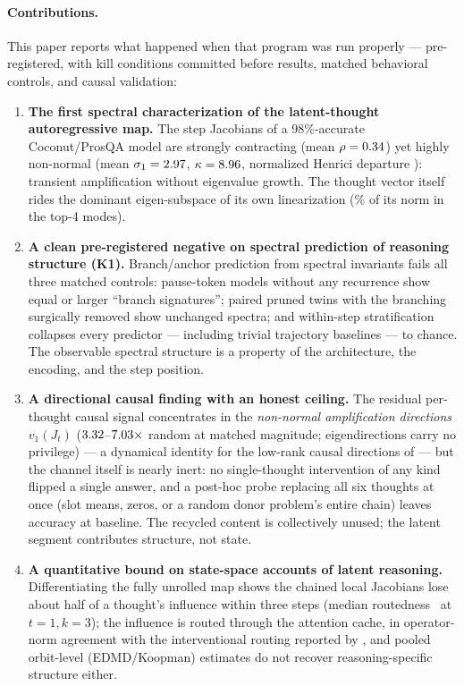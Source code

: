 \documentclass[11pt]{article}
\newcommand{\Jt}{J_t}
\newcommand{\sigmaone}{\sigma_1}
\begin{document}
\paragraph{Contributions.} This paper reports what happened when that program was
run properly --- pre-registered, with kill conditions committed before results,
matched behavioral controls, and causal validation:

\begin{enumerate}
\item \textbf{The first spectral characterization of the latent-thought
autoregressive map.} The step Jacobians of a 98\%-accurate Coconut/ProsQA model
are strongly contracting (mean $\rho=0.34$) yet highly non-normal (mean
$\sigmaone=\meanSigmaMTwo$, $\kappa=8.96$, normalized Henrici departure
\meanHenriciMTwo): transient amplification without eigenvalue growth. The thought
vector itself rides the dominant eigen-subspace of its own linearization
(\subCFracPct\% of its norm in the top-4 modes).
\item \textbf{A clean pre-registered negative on spectral prediction of reasoning
structure (K1).} Branch/anchor prediction from spectral invariants fails all three
matched controls: pause-token models without any recurrence show equal or larger
``branch signatures''; paired pruned twins with the branching surgically removed
show unchanged spectra; and within-step stratification collapses every predictor
--- including trivial trajectory baselines --- to chance. The observable spectral
structure is a property of the architecture, the encoding, and the step position.
\item \textbf{A directional causal finding with an honest ceiling.} The residual
per-thought causal signal concentrates in the \emph{non-normal amplification
directions} $v_1(\Jt)$ ($3.32$--$7.03\times$ random at
matched magnitude; eigendirections carry no privilege) --- a dynamical identity for
the low-rank causal directions of \citet{aswal2026observable} --- but the channel
itself is nearly inert: no single-thought intervention of any kind flipped a
single answer, and a post-hoc probe replacing all six thoughts at once (slot
means, zeros, or a random donor problem's entire chain) leaves accuracy at
baseline. The recycled content is collectively unused; the latent segment
contributes structure, not state.
\item \textbf{A quantitative bound on state-space accounts of latent reasoning.}
Differentiating the fully unrolled map shows the chained local Jacobians lose
about half of a thought's influence within three steps (median routedness
\routedMedianOneThree\ at $t{=}1,k{=}3$); the influence is routed through the
attention cache, in operator-norm agreement with the interventional routing
reported by \citet{li2026dynamics}, and pooled orbit-level (EDMD/Koopman)
estimates do not recover reasoning-specific structure either.
\end{enumerate}
\end{document}
